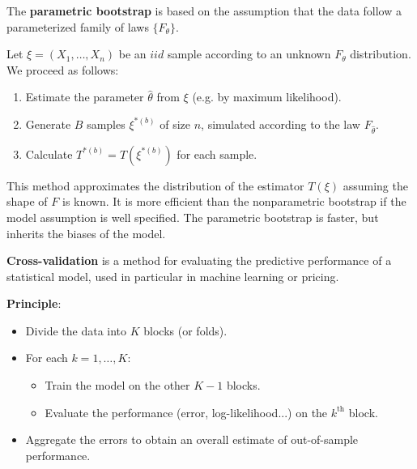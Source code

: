\begin{f}
	
	The \textbf{parametric bootstrap} is based on the assumption that the data follow a parameterized family of laws \(\{F_\theta\}\).
	
	Let \(\xi = (X_1, \ldots, X_n)\) be an \(iid\) sample according to an unknown \(F_\theta\) distribution. We proceed as follows:
	\begin{enumerate}
		\item Estimate the parameter \(\hat{\theta}\) from \(\xi\) (e.g. by maximum likelihood).
		\item Generate \(B\) samples \(\xi^{\ast(b)}\) of size \(n\), simulated according to the law \(F_{\hat{\theta}}\).
		\item Calculate \(T^{\ast(b)} = T(\xi^{\ast(b)})\) for each sample.
	\end{enumerate}
	
	This method approximates the distribution of the estimator \(T(\xi)\) assuming the shape of \(F\) is known. It is more efficient than the nonparametric bootstrap if the model assumption is well specified. The parametric bootstrap is faster, but inherits the biases of the model.
	
\end{f}

\begin{f}
	
	\textbf{Cross-validation} is a method for evaluating the predictive performance of a statistical model, used in particular in machine learning or pricing.
	
	\textbf{Principle}:
	\begin{itemize}
		\item Divide the data into \(K\) blocks (or folds).
		\item For each \(k = 1,\ldots,K\):
		\begin{itemize}
			\item Train the model on the other \(K-1\) blocks.
			\item Evaluate the performance (error, log-likelihood...) on the \(k^{\text{th}}\) block.
		\end{itemize}
		\item Aggregate the errors to obtain an overall estimate of out-of-sample performance.
	\end{itemize}
	
\end{f}

